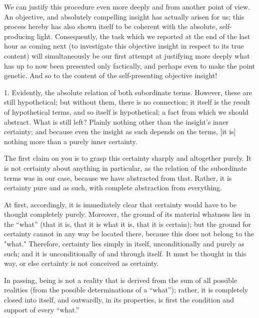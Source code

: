 We can justify this procedure even more deeply
and from another point of view.
An objective, and absolutely compelling insight
has actually arisen for us;
this process hereby has also shown itself
to be coherent with the absolute, self-producing light.
Consequently, the task which we reported
at the end of the last hour as coming next
(to investigate this objective insight
in respect to its true content)
will simultaneously be our first attempt at justifying more deeply
what has up to now been presented only factically,
and perhaps even to make the point genetic.
And so to the content of the self-presenting objective insight!

1. Evidently, the absolute relation of both subordinate terms.
However, these are still hypothetical;
but without them, there is no connection;
it itself is the result of hypothetical terms,
and so itself is hypothetical;
a fact from which we should abstract.
What is still left?
Plainly nothing other than the insight's inner certainty;
and because even the insight as such depends on the terms,
[it is] nothing more than a purely inner certainty.

The first claim on you is to grasp
this certainty sharply and altogether purely.
It is not certainty about anything in particular,
as the relation of the subordinate terms was in our case,
because we have abstracted from that.
Rather, it is certainty pure and as such,
with complete abstraction from everything.

At first, accordingly, it is immediately clear
that certainty would have to be thought completely purely.
Moreover, the ground of its material whatness lies in the “what”
(that it is, that it is what it is, that it is certain);
but the ground for certainty cannot in any way be located there,
because this does not belong to the "what."
Therefore, certainty lies simply in itself,
unconditionally and purely as such;
and it is unconditionally of and through itself.
It must be thought in this way,
or else certainty is not conceived as certainty.

In passing, being is not a reality that is
derived from the sum of all possible realities
(from the possible determinations of a “what”);
rather, it is completely closed into itself,
and outwardly, in its properties, is
first the condition and support of every “what.”

